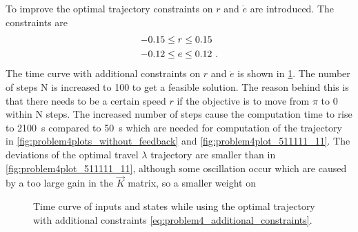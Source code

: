 To improve the optimal trajectory constraints on $r$ and $\dot{e}$ are introduced. The constraints are
\begin{subequations}
	\begin{align}
	-0.15&\leq r\leq0.15\\
	-0.12&\leq e\leq0.12\FullStop
	\end{align}
	\label{eq:problem4_additional_constraints}%
\end{subequations}
The time curve with additional constraints on $r$ and $\dot{e}$ is shown in \cref{fig:LQR_bothconstraint_N=100_LQR}. The number of steps N is increased to 100 to get a feasible solution.  The reason behind this is that there needs to be a certain speed $r$ if the objective is to move from $\pi$ to 0 within N steps. The increased number of steps cause the computation time to rise to \SI{2100}{\second} compared to \SI{50}{\second} which are needed for computation of the trajectory in \cref{fig:problem4plots_without_feedback} and \cref{fig:problem4plot_511111_11}. The deviations of the optimal travel $\lambda$ trajectory are smaller than in \cref{fig:problem4plot_511111_11}, although some oscillation occur which are caused by a too large gain in the $\vec{K}$ matrix, so a smaller weight on 



\begin{figure}[htbp]
	\centering
	\caption{Time curve of inputs and states while using the optimal trajectory with additional constraints \eqref{eq:problem4_additional_constraints}.}
	\label{fig:LQR_bothconstraint_N=100_LQR}%
\end{figure}

